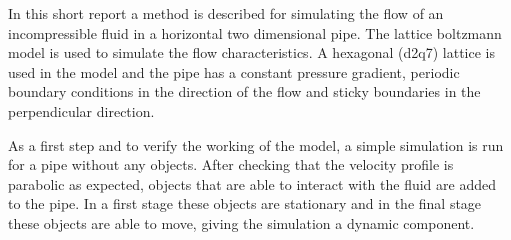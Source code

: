 In this short report a method is described for simulating the flow of an incompressible fluid in a horizontal two dimensional pipe. The lattice boltzmann model is used to simulate the flow characteristics. A hexagonal (d2q7) lattice is used in the model and the pipe has a constant pressure gradient, periodic boundary conditions in the direction of the flow and sticky boundaries in the perpendicular direction.

As a first step and to verify the working of the model, a simple simulation is run for a pipe without any objects. After checking that the velocity profile is parabolic as expected, objects that are able to interact with the fluid are added to the pipe. In a first stage these objects are stationary and in the final stage these objects are able to move, giving the simulation a dynamic component.